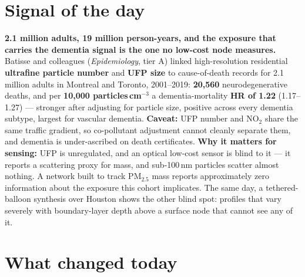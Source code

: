 \documentclass[10pt]{article}
\begin{document}
\vspace{6mm}

\section*{\sffamily\bfseries\color{Deep}Signal of the day}
\vspace{-1.5mm}{\color{Amber}\rule{\linewidth}{1.1pt}}\vspace{2.5mm}

\begin{keybox}
{\sffamily\bfseries\small\color{Deep}2.1 million adults, 19 million person-years, and the
exposure that carries the dementia signal is the one no low-cost node measures.}\\[1.4mm]
\footnotesize
Batisse and colleagues (\textit{Epidemiology}, tier A) linked high-resolution residential \textbf{ultrafine
particle number} and \textbf{UFP size} to cause-of-death records for 2.1\,million adults in Montreal and
Toronto, 2001--2019: \textbf{20,560} neurodegenerative deaths, and per \textbf{10,000 particles\,cm$^{-3}$}
a dementia-mortality \textbf{HR of 1.22} (1.17--1.27) --- stronger after adjusting for particle size,
positive across every dementia subtype, largest for vascular dementia. \textbf{Caveat:} UFP number and
NO$_2$ share the same traffic gradient, so co-pollutant adjustment cannot cleanly separate them, and
dementia is under-ascribed on death certificates.
\textbf{Why it matters for sensing:} UFP is unregulated, and an optical low-cost sensor is blind to it ---
it reports a scattering proxy for mass, and sub-100\,nm particles scatter almost nothing. A network built
to track PM$_{2.5}$ mass reports approximately zero information about the exposure this cohort implicates.
The same day, a tethered-balloon synthesis over Houston shows the other blind spot: profiles that vary
severely with boundary-layer depth above a surface node that cannot see any of it.\par
\end{keybox}

\vspace{3mm}

\section*{\sffamily\bfseries\color{Deep}What changed today}
\vspace{-1.5mm}{\color{Amber}\rule{\linewidth}{1.1pt}}\vspace{2.5mm}
\end{document}
